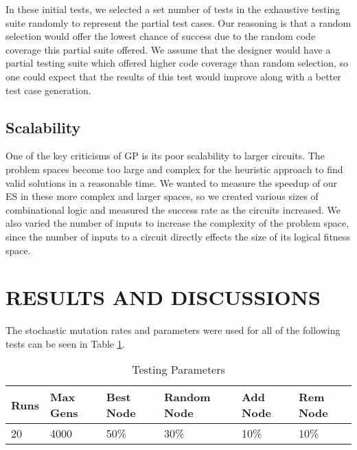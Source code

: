 \documentclass[conference]{IEEEtran}
\begin{document}
{\par In these initial tests, we selected a set number of tests in the exhaustive testing suite randomly to represent the partial test cases.
Our reasoning is that a random selection would offer the lowest chance of success due to the random code coverage this partial suite offered.
We assume that the designer would have a partial testing suite which offered higher code coverage than random selection, so one could expect that the results of this test would improve along with a better test case generation. 

\subsection{Scalability}
\par One of the key criticisms of GP is its poor scalability to larger circuits. %
The problem spaces become too large and complex for the heuristic approach to find valid solutions in a reasonable time.
We wanted to measure the speedup of our ES in these more complex and larger spaces, so we created various sizes of combinational logic and measured the success rate as the circuits increased. 
We also varied the number of inputs to increase the complexity of the problem space, since the number of inputs to a circuit directly effects the size of its logical fitness space.


\section{RESULTS AND DISCUSSIONS}
\par The stochastic mutation rates and parameters were used for all of the following tests can be seen in Table \ref{tbl:partial_params}.
\begin{table}
\centering
    \begin{tabular}[\textwidth]{||p{1cm}|p{1cm}|p{1cm}|p{1cm}|p{1cm}|p{1cm}||}
         \hline
         Runs & Max Gens & Best Node & Random Node & Add Node & Rem Node \\ [0.5ex] 
         \hline\hline
         20 & 4000 & 50\% & 30\% & 10\% & 10\%\\ 
         \hline
    \end{tabular}
    \caption{Testing Parameters}
    \label{tbl:partial_params}
\end{table}


}
\end{document}
